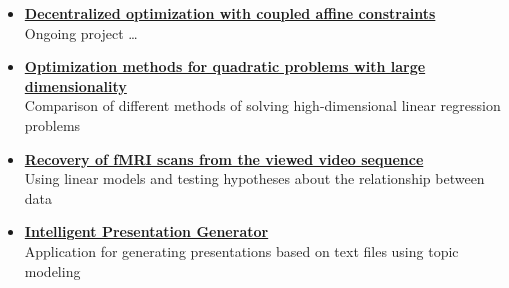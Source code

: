 \documentclass[12pt]{moderncv}
\begin{document}
        \begin{itemize}
            \item \href{https://github.com/kisnikser/Decentralized-Optimization}{\textbf{Decentralized optimization with coupled affine constraints}}\\
            Ongoing project \dots
            \item \href{https://github.com/kisnikser/Optimization-Methods}{\textbf{Optimization methods for quadratic problems with large dimensionality}}\\
            Comparison of different methods of solving high-dimensional linear regression problems
            \item \href{https://github.com/intsystems/2023-Project-112}{\textbf{Recovery of fMRI scans from the viewed video sequence}}\\
            Using linear models and testing hypotheses about the relationship between data
            \item \href{https://github.com/kisnikser/Intelligent-Presentation-Generator}{\textbf{Intelligent Presentation Generator}}\\
            Application for generating presentations based on text files using topic modeling
        \end{itemize}

    
\end{document}
